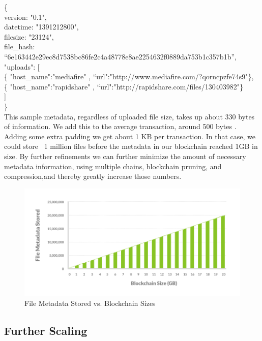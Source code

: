 \documentclass[a4paper,12pt]{article}
\begin{document}
\{\\
\indent\indent version: "0.1",\\
\indent\indent datetime: "1391212800",\\
\indent\indent filesize: "23124",\\
\indent\indent file\_hash: ``6e163442e29ec8d7538bc86fe2c4a48778e8ae2254632f0889da753b1c357b1b'', \\
\indent\indent  "uploads": [\\
\indent\indent \{ "host\_name":"mediafire" , ``url":"http://www.mediafire.com/?qorncpzfe74s9"\},\\ 
\indent\indent\{ "host\_name":"rapidshare" , ``url":"http://rapidshare.com/files/130403982"\}\\
\indent\indent]\\
\indent\}\\

This sample metadata, regardless of uploaded file size, takes up about 330 bytes of information. We add this to the average transaction, around 500 bytes \cite{13}. Adding some extra padding we get about 1 KB per transaction. In that case, we could store ~1 million files before the metadata in our blockchain reached 1GB in size. By further refinements we can further minimize the amount of necessary metadata information, using multiple chains, blockchain pruning, and compression,and thereby greatly increase those numbers.	

\begin{figure}[h!]
  \centering
      \includegraphics[width=\linewidth]{06}
  \caption{File Metadata Stored vs. Blockchain Sizes}
\end{figure}

\subsection*{Further Scaling}
\end{document}
